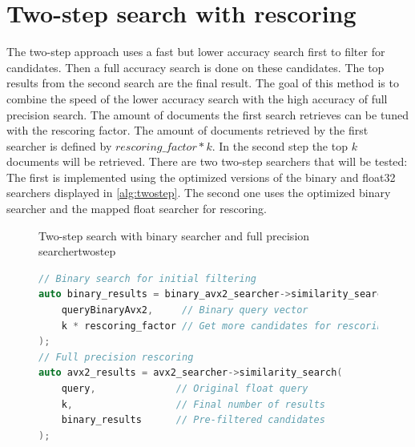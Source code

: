 \section{Two-step search with rescoring}
\label{sec:twostep}
The two-step approach uses a fast but lower accuracy search first to filter for candidates. Then a full accuracy search is done on these candidates. The top results from the second search are the final result. The goal of this method is to combine the speed of the lower accuracy search with the high accuracy of full precision search. The amount of documents the first search retrieves can be tuned with the rescoring factor. The amount of documents retrieved by the first searcher is defined by $rescoring\_factor * k$. In the second step the top $k$ documents will be retrieved. There are two two-step searchers that will be tested: The first is implemented using the optimized versions of the binary and float32 searchers displayed in \autoref{alg:twostep}. The second one uses the optimized binary searcher and the mapped float searcher for rescoring.

\begin{figure}[h]
    \begin{algorithm}{Two-step search with binary searcher and full precision searcher}{twostep}
        \begin{lstlisting}[language=C++]
// Binary search for initial filtering
auto binary_results = binary_avx2_searcher->similarity_search(
    queryBinaryAvx2,     // Binary query vector
    k * rescoring_factor // Get more candidates for rescoring
);
// Full precision rescoring
auto avx2_results = avx2_searcher->similarity_search(
    query,              // Original float query
    k,                  // Final number of results
    binary_results      // Pre-filtered candidates
);
        \end{lstlisting}
    \end{algorithm}
\end{figure}